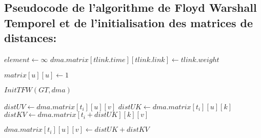 \subsection{Pseudocode de l'algorithme de Floyd Warshall Temporel et de l'initialisation des matrices de distances:}


\begin{algorithm}[H]
 \caption{$InitTFW(graphe temporel \ GT, DistanceMatrixes \ dma$)}
    \begin{algorithmic}
        
   
			\State $element \gets \infty$
		\EndFor
	\EndFor
		\State $dma.matrix[tlink.time][tlink.link] \gets tlink.weight$ 
	\EndFor

			\State $matrix[u][u] \gets 1$
		\EndFor
	\EndFor
\end{algorithmic}
\end{algorithm}


\begin{algorithm}[H]
    \caption{$TemporalFloydWarshall(graphe temporel \ GT, DistanceMatrixes \ dma)$}
\begin{algorithmic}
	\State $InitTFW(GT, dma)$

				
					\State $distUV \gets dma.matrix[t_{i}][u][v]$
					\State $distUK \gets dma.matrix[t_{i}][u][k]$
					\State $distKV \gets dma.matrix[t_{i}+distUK][k][v]$

						\State $dma.matrix[t_{i}][u][v] \gets distUK + distKV$
					\EndIf
				\EndFor
			\EndFor
		\EndFor
		

	\EndFor 
\end{algorithmic}
\end{algorithm}

